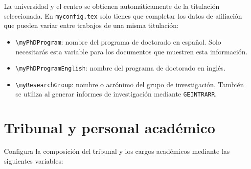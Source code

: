 La universidad y el centro se obtienen automáticamente de la titulación seleccionada. En \texttt{myconfig.tex} solo tienes que completar los datos de afiliación que pueden variar entre trabajos de una misma titulación:

\begin{itemize}
  \item \texttt{\textbackslash{}myPhDProgram}: nombre del programa de doctorado en español. Solo necesitarás esta variable para los documentos que muestren esta información.
  \item \texttt{\textbackslash{}myPhDProgramEnglish}: nombre del programa de doctorado en inglés.
  \item \texttt{\textbackslash{}myResearchGroup}: nombre o acrónimo del grupo de investigación. También se utiliza al generar informes de investigación mediante \texttt{GEINTRARR}.
\end{itemize}

\section{Tribunal y personal académico}

Configura la composición del tribunal y los cargos académicos mediante las siguientes variables:

